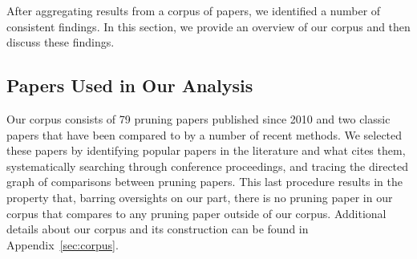 
After aggregating results from a corpus of \npapers papers, we identified a number of consistent findings. In this section, we provide an overview of our corpus and then discuss these findings.

\vspace{-.75mm}
\subsection{Papers Used in Our Analysis}
\vspace{-.25mm}

Our corpus consists of 79 pruning papers published since 2010 and two classic papers \cite{optimal-brain-damage, optimal-brain-surgeon} that have been compared to by a number of recent methods. We selected these papers by identifying popular papers in the literature and what cites them, systematically searching through conference proceedings, and tracing the directed graph of comparisons between pruning papers. This last procedure results in the property that, barring oversights on our part, there is no pruning paper in our corpus that compares to any pruning paper outside of our corpus. Additional details about our corpus and its construction can be found in Appendix~\ref{sec:corpus}.


